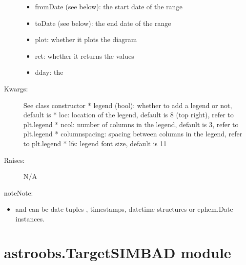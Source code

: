 \documentclass[letterpaper,10pt,english]{sphinxmanual}
\begin{document}
\begin{fulllineitems}
\begin{fulllineitems}
\begin{description}
\begin{itemize}
\item {} 
fromDate (see below): the start date of the range

\item {} 
toDate (see below): the end date of the range

\item {} 
plot: whether it plots the diagram

\item {} 
ret: whether it returns the values

\item {} 
dday: the

\end{itemize}

\item[{Kwargs:}] \leavevmode
See class constructor
* legend (bool): whether to add a legend or not, default is 
* loc: location of the legend, default is 8 (top right), refer to plt.legend
* ncol: number of columns in the legend, default is 3, refer to plt.legend
* columnspacing: spacing between columns in the legend, refer to plt.legend
* lfs: legend font size, default is 11

\item[{Raises:}] \leavevmode
N/A

\end{description}

\begin{notice}{note}{Note:}\begin{itemize}
\item {} 
 and  can be date-tuples , timestamps, datetime structures or ephem.Date instances.

\end{itemize}
\end{notice}

\end{fulllineitems}


\end{fulllineitems}



\section{astroobs.TargetSIMBAD module}
\label{astroobs:astroobs-targetsimbad-module}\label{astroobs:module-astroobs.TargetSIMBAD}
\end{document}
